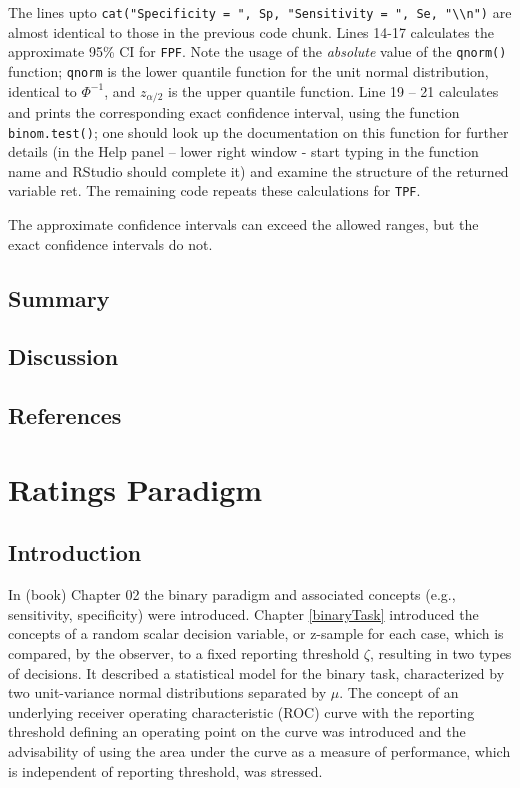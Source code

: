 \documentclass[
]{book}
\begin{document}
The lines upto \texttt{cat("Specificity\ =\ ",\ Sp,\ "Sensitivity\ =\ ",\ Se,\ "\textbackslash{}\textbackslash{}n")} are almost identical to those in the previous code chunk. Lines 14-17 calculates the approximate 95\% CI for \texttt{FPF}. Note the usage of the \emph{absolute} value of the \texttt{qnorm()} function; \texttt{qnorm} is the lower quantile function for the unit normal distribution, identical to \(\Phi^{-1}\), and \(z_{\alpha/2}\) is the upper quantile function. Line 19 -- 21 calculates and prints the corresponding exact confidence interval, using the function \texttt{binom.test()}; one should look up the documentation on this function for further details (in the Help panel -- lower right window - start typing in the function name and RStudio should complete it) and examine the structure of the returned variable ret. The remaining code repeats these calculations for \texttt{TPF}.

The approximate confidence intervals can exceed the allowed ranges, but the exact confidence intervals do not.

\hypertarget{binaryTask-Summary}{%
\section{Summary}\label{binaryTask-Summary}}

\hypertarget{binaryTask-Discussion}{%
\section{Discussion}\label{binaryTask-Discussion}}

\hypertarget{binaryTask-references}{%
\section{References}\label{binaryTask-references}}

\hypertarget{ratingsParadigm}{%
\chapter{Ratings Paradigm}\label{ratingsParadigm}}

\hypertarget{introduction}{%
\section{Introduction}\label{introduction}}

In (book) Chapter 02 the binary paradigm and associated concepts (e.g., sensitivity, specificity) were introduced. Chapter \ref{binaryTask} introduced the concepts of a random scalar decision variable, or z-sample for each case, which is compared, by the observer, to a fixed reporting threshold \(\zeta\), resulting in two types of decisions. It described a statistical model for the binary task, characterized by two unit-variance normal distributions separated by \(\mu\). The concept of an underlying receiver operating characteristic (ROC) curve with the reporting threshold defining an operating point on the curve was introduced and the advisability of using the area under the curve as a measure of performance, which is independent of reporting threshold, was stressed.
\end{document}
